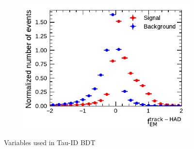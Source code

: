 \begin{figure}[!ht]
\begin{subfigure}{0.5\textwidth}
  \end{subfigure}%
  \begin{subfigure}{0.5\textwidth}
    \centering
    \includegraphics{./figures/baseline_bdt_vars/1p/ChPiEMEOverCaloEME.pdf}
  \end{subfigure}
  \caption{Variables used in Tau-ID BDT}
  \label{fig:bdt_vars_1p_overlays}
\end{figure}

